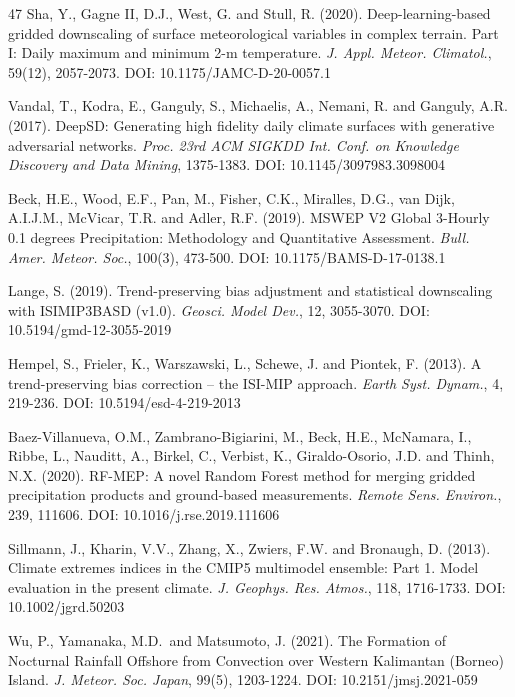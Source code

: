 \documentclass[11pt,a4paper]{article}
\begin{document}
\begin{thebibliography}{47}
 Sha, Y., Gagne II, D.J., West, G. and Stull, R. (2020).
Deep-learning-based gridded downscaling of surface meteorological
variables in complex terrain. Part I: Daily maximum and minimum 2-m
temperature. \emph{J. Appl. Meteor. Climatol.}, 59(12), 2057-2073. DOI:
10.1175/JAMC-D-20-0057.1

 Vandal, T., Kodra, E., Ganguly, S., Michaelis, A., Nemani, R.
and Ganguly, A.R. (2017). DeepSD: Generating high fidelity daily climate
surfaces with generative adversarial networks. \emph{Proc. 23rd ACM
SIGKDD Int. Conf. on Knowledge Discovery and Data Mining}, 1375-1383.
DOI: 10.1145/3097983.3098004

 Beck, H.E., Wood, E.F., Pan, M., Fisher, C.K., Miralles, D.G.,
van Dijk, A.I.J.M., McVicar, T.R. and Adler, R.F. (2019). MSWEP V2
Global 3-Hourly 0.1 degrees Precipitation: Methodology and Quantitative
Assessment. \emph{Bull. Amer. Meteor. Soc.}, 100(3), 473-500. DOI:
10.1175/BAMS-D-17-0138.1

 Lange, S. (2019). Trend-preserving bias adjustment and
statistical downscaling with ISIMIP3BASD (v1.0). \emph{Geosci. Model
Dev.}, 12, 3055-3070. DOI: 10.5194/gmd-12-3055-2019

 Hempel, S., Frieler, K., Warszawski, L., Schewe, J. and
Piontek, F. (2013). A trend-preserving bias correction -- the ISI-MIP
approach. \emph{Earth Syst. Dynam.}, 4, 219-236. DOI:
10.5194/esd-4-219-2013

 Baez-Villanueva, O.M., Zambrano-Bigiarini, M., Beck, H.E.,
McNamara, I., Ribbe, L., Nauditt, A., Birkel, C., Verbist, K.,
Giraldo-Osorio, J.D. and Thinh, N.X. (2020). RF-MEP: A novel Random
Forest method for merging gridded precipitation products and
ground-based measurements. \emph{Remote Sens. Environ.}, 239, 111606.
DOI: 10.1016/j.rse.2019.111606

 Sillmann, J., Kharin, V.V., Zhang, X., Zwiers, F.W. and
Bronaugh, D. (2013). Climate extremes indices in the CMIP5 multimodel
ensemble: Part 1. Model evaluation in the present climate. \emph{J.
Geophys. Res. Atmos.}, 118, 1716-1733. DOI: 10.1002/jgrd.50203

 Wu, P., Yamanaka, M.D.~and Matsumoto, J. (2021). The Formation
of Nocturnal Rainfall Offshore from Convection over Western Kalimantan
(Borneo) Island. \emph{J. Meteor. Soc. Japan}, 99(5), 1203-1224. DOI:
10.2151/jmsj.2021-059


\end{thebibliography}
\end{document}
